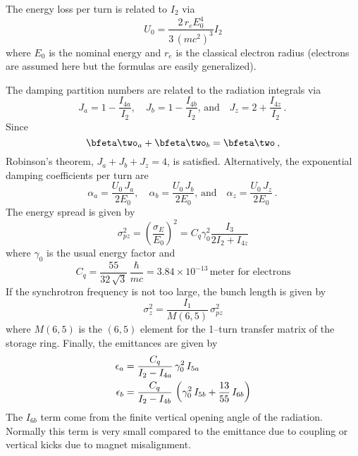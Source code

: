 The energy loss per turn is related to $I_2$ via
  \begin{equation}
    U_0 = \frac{2 \, r_e E_0^4}{3 \, (mc^2)^3} I_2
  \end{equation}
where $E_0$ is the nominal energy and $r_e$ is the classical electron radius (electrons are assumed
here but the formulas are easily generalized).

The damping partition numbers are related to the radiation integrals via
  \begin{equation}
    J_a = 1 - \frac{I_{4a}}{I_2} \comma \quad
    J_b = 1 - \frac{I_{4b}}{I_2} \comma \, \text{and} \quad \label{j1ii}
    J_z = 2 + \frac{I_{4z}}{I_2} \period
  \end{equation}
Since 
  \begin{equation}          
    \bfeta\two_{a} + \bfeta\two_{b} = \bfeta\two
    \comma \label{eee}
  \end{equation}
Robinson's theorem, $J_a + J_b + J_z = 4$, is satisfied.
Alternatively, the exponential damping coefficients per turn are
  \begin{equation}
    \alpha_a = \frac{U_0 \, J_a}{2 E_0} \comma \quad
    \alpha_b = \frac{U_0 \, J_b}{2 E_0} \comma \, \text{and} \quad
    \alpha_z = \frac{U_0 \, J_z}{2 E_0} \period
  \end{equation}
The energy spread is given by
  \begin{equation}
    \sigma_{pz}^2 = \left( \frac{\sigma_E}{E_0} \right)^2 = 
    C_q \gamma_0^2 \frac{I_3}{2I_2 + I_{4z}}
  \end{equation}
where $\gamma_0$ is the usual energy factor and 
  \begin{equation}
    C_q = \frac{55}{32 \, \sqrt{3}} \, \frac{\hbar}{mc} = 
    3.84 \times 10^{-13} \, \text{meter for electrons}
  \end{equation}
If the synchrotron frequency is not too large, the bunch length is given by
  \begin{equation}
    \sigma_z^2 = \frac{I_1}{M(6,5)} \, \sigma_{pz}^2
  \end{equation}
where $M(6,5)$ is the $(6,5)$ element for the 1--turn transfer matrix
of the storage ring. Finally, the emittances are given by
  \begin{align}
    \epsilon_a &= \frac{C_q}{I_2 - I_{4a}} 
      \, \gamma_0^2 \, I_{5a} \nonumber \\
    \epsilon_b &= \frac{C_q}{I_2 - I_{4b}} 
      \, \left( \gamma_0^2 \, I_{5b} + \frac{13}{55} \, I_{6b} \right)
  \end{align}
The $I_{6b}$ term come from the finite vertical opening angle of the
radiation\cite{b:tol}. Normally this term is very small compared to
the emittance due to coupling or vertical kicks due to magnet misalignment.

